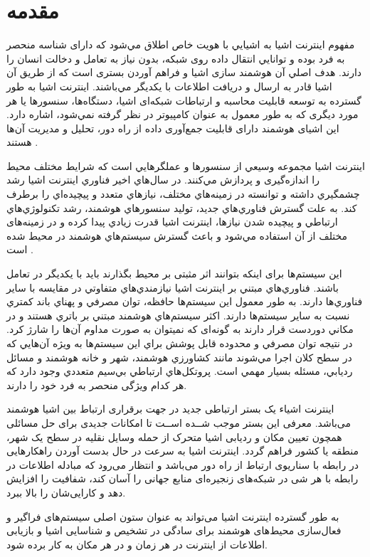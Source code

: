 \chapter{مقدمه}
مفهوم اينترنت اشيا  به اشيايي با هويت خاص اطلاق مي‌شود كه دارای شناسه منحصر به فرد بوده و توانايي انتقال داده روی شبکه، بدون نياز به تعامل و دخالت انسان را دارند. هدف اصلي آن هوشمند سازی اشيا و فراهم آوردن بستری است كه از طريق آن اشيا قادر به ارسال و دريافت اطلاعات با يکديگر مي‌باشند. اينترنت اشيا به طور گسترده به توسعه قابليت محاسبه و ارتباطات شبکه‌ای اشيا، دستگاه‌ها، سنسورها يا هر مورد ديگری كه به طور معمول به عنوان كامپيوتر در نظر گرفته نمي‌شود، اشاره دارد. اين اشيای هوشمند دارای قابليت جمع‌آوری داده از راه دور، تحليل و مديريت آن‌ها هستند \cite{Mukhtar2015}.


اینترنت اشیا مجموعه وسيعي از سنسورها و عملگرهايي است كه شرايط مختلف محیط را اندازه‌گیری و پردازش مي‌كنند. در سال‌هاي اخير فناوري اينترنت اشيا رشد چشمگيري داشته و توانسته در زمينه‌هاي مختلف، نيازهاي متعدد و پيچيده‌اي را برطرف كند. به علت گسترش فناوري‌هاي جديد، توليد سنسورهاي هوشمند، رشد تكنولوژي‌هاي ارتباطي و پيچيده شدن نيازها، اينترنت اشيا قدرت زيادي پيدا كرده و در زمینه‌های مختلف از آن استفاده مي‌شود و باعث گسترش سيستم‌هاي هوشمند در محیط شده است \cite{Shah2016}.


 این سیستم‌ها برای اینکه بتوانند اثر مثبتی بر محیط بگذارند باید با یکدیگر در تعامل باشند. فناوري‌هاي مبتني بر اينترنت اشيا نيازمندي‌هاي متفاوتي در مقايسه با ساير فناوري‌ها دارند. به طور معمول اين سيستم‌ها حافظه، توان مصرفي و پهناي باند كمتري نسبت به ساير سيستم‌ها دارند. اكثر سيستم‌هاي هوشمند مبتني بر باتري هستند و در مكاني دوردست قرار دارند به گونه‌ای كه نمیتوان به صورت مداوم آن‌ها را شارژ كرد. در نتيجه توان مصرفي و محدوده قابل پوشش براي اين سيستم‌ها به ويژه آن‌هايي كه در سطح كلان اجرا مي‌شوند مانند كشاورزي هوشمند، شهر و خانه هوشمند و مسائل رديابي، مسئله بسيار مهمي است. پروتكل‌هاي ارتباطي بي‌سيم متعددي وجود دارد كه هر كدام ويژگی منحصر به فرد خود را دارند.


اینترنت اشیاء یک بستر ارتباطی جدید در جهت برقراری ارتباط بین اشیا هوشمند می‌باشد. معرفی این بستر موجب شــده اســت تا امکانات جدیدی برای حل مسائلی همچون تعیین مکان و ردیابی اشیا متحرک از حمله وسایل نقلیه در سطح یک شهر، منطقه یا کشور فراهم گردد. اینترنت اشیا به سرعت در حال بدست آوردن راهکارهایی در رابطه با سناریوی ارتباط از راه دور می‌باشد و انتظار می‌رود که مبادله اطلاعات در رابطه با هر شی در شبکه‌های زنجیره‌ای منابع جهانی را آسان کند، شفافیت را افزایش دهد و کارایی‌شان را بالا ببرد.

به طور گسترده اینترنت اشیا می‌تواند به عنوان ستون اصلی سیستم‌های فراگیر و فعال‌سازی محیط‌های هوشمند برای سادگی در تشخیص و شناسایی اشیا و بازیابی اطلاعات از اینترنت در هر زمان و در هر مکان به کار برده شود.


